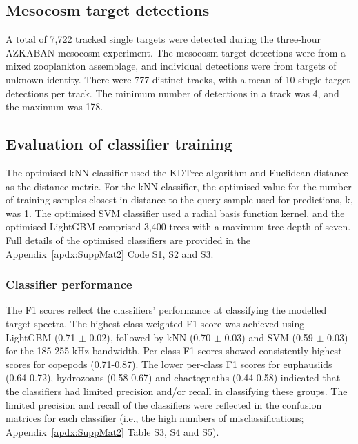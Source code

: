 
\subsection{Mesocosm target detections}
A total of 7,722 tracked single targets were detected during the three-hour AZKABAN mesocosm experiment. The mesocosm target detections were from a mixed zooplankton assemblage, and individual detections were from targets of unknown identity. There were 777 distinct tracks, with a mean of 10 single target detections per track. The minimum number of detections in a track was 4, and the maximum was 178. 

\subsection{Evaluation of classifier training}
The optimised kNN classifier used the KDTree algorithm \citep{Pedregosa2011} and Euclidean distance as the distance metric. For the kNN classifier, the optimised value for the number of training samples closest in distance to the query sample used for predictions, k, was 1. The optimised SVM classifier used a radial basis function kernel, and the optimised LightGBM comprised 3,400 trees with a maximum tree depth of seven. Full details of the optimised classifiers are provided in the Appendix~\ref{apdx:SuppMat2} Code S1, S2 and S3.

\subsubsection{Classifier performance}
The F1 scores reflect the classifiers' performance at classifying the modelled target spectra. The highest class-weighted F1 score was achieved using LightGBM (0.71 $\pm$ 0.02), followed by kNN (0.70 $\pm$ 0.03) and SVM (0.59 $\pm$ 0.03) for the 185-255 kHz bandwidth. Per-class F1 scores showed consistently highest scores for copepods (0.71-0.87). The lower per-class F1 scores for euphausiids (0.64-0.72), hydrozoans (0.58-0.67) and chaetognaths (0.44-0.58) indicated that the classifiers had limited precision and/or recall in classifying these groups. The limited precision and recall of the classifiers were reflected in the confusion matrices for each classifier (i.e., the high numbers of misclassifications; Appendix~\ref{apdx:SuppMat2} Table S3, S4 and S5). \\

